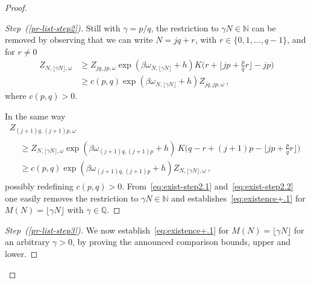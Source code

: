 \documentclass[10pt]{amsart}
\theoremstyle{definition}\newtheorem{defi}[theo]{Definition}\newtheorem{rema}[theo]{Remark}\newtheorem{exam}[theo]{Example}\newtheorem{exem}[theo]{Example}\newtheorem{nota}[theo]{Notation}
\newenvironment{step}[1]{\begin{proof}[{#1}]}{\let\qed\relax\end{proof}}
\newcommand{\gb}{\beta}
\newcommand{\go}{\omega}
\newcommand{\bbN}{\ensuremath{\mathbb{N}}}
\newcommand{\bbQ}{\ensuremath{\mathbb{Q}}}
\begin{document}
\begin{proof}
\begin{step}{Step~(\ref{pr-list-step2})}
Still with $\gamma =p/q$, the restriction to $\gamma N \in \bbN$ can be removed by observing that we can write $N= jq+r$, with $r\in \{0, 1, \ldots, q-1\}$, and for $r\neq 0$
\begin{equation}\label{eq:exist-step2.1}
\begin{split}
Z_{N, \lfloor \gamma N \rfloor, \go} &\ge Z_{jq, jp, \go} \exp(\gb \go_{N, \lfloor \gamma N \rfloor}+h) K \Big(r+ \Big \lfloor jp+ \frac{p}{q} r \Big \rfloor -jp \Big)
\\ & \ge c(p,q) \exp(\gb \go_{N, \lfloor \gamma N \rfloor}+h) Z_{jq, jp, \go}\,,
\end{split}
\end{equation}
where $c(p,q)>0$.

In the same way
\begin{multline}\label{eq:exist-step2.2}
Z_{(j+1)q, (j+1)p, \go}\\
\begin{aligned}
&\ge Z_{N, \lfloor \gamma N \rfloor, \go} \exp(\gb \go_{(j+1)q, (j+1)p}+h)\,K \Big(q-r+ (j+1)p- \Big \lfloor jp+ \frac{p}{q} r \Big \rfloor\!\Big)\\
&\ge c(p,q) \exp(\gb \go_{(j+1)q, (j+1)p}+h) Z_{N, \lfloor \gamma N \rfloor, \go}\,,
\end{aligned}
\end{multline}
possibly redefining $c(p,q)>0$. From~\eqref{eq:exist-step2.1} and~\eqref{eq:exist-step2.2} one easily removes the restriction to $\gamma N \in \bbN$ and establishes~\eqref{eq:existence+.1} for $M(N) = \lfloor \gamma N \rfloor$ with $\gamma\in \bbQ$.
\end{step}

\begin{step}{Step~(\ref{pr-list-step3})}
We now establish~\eqref{eq:existence+.1} for $M(N)= \lfloor \gamma N\rfloor$ for an arbitrary $\gamma>0$, by proving the announced comparison bounds, upper and lower.


\end{step}
\end{proof}
\end{document}
